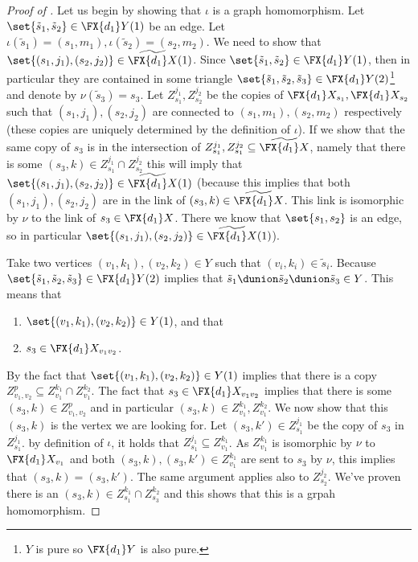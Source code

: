 \begin{proof}[Proof of ]
    Let us begin by showing that \(\iota\) is a graph homomorphism. Let \(\set{\tilde{s}_1,\tilde{s}_2} \in \FX{d_1}Y(1)\) be an edge. Let \(\iota(\tilde{s}_1) = (s_1,m_1), \iota(\tilde{s}_2)=(s_2,m_2)\). We need to show that \(\set{(s_1,j_1), (s_2,j_2)} \in \widetilde{\FX{d_1}X}(1)\). Since \(\set{\tilde{s}_1,\tilde{s}_2} \in \FX{d_1}Y(1)\), then in particular they are contained in some triangle \(\set{\tilde{s}_1,\tilde{s}_2,\tilde{s}_3} \in \FX{d_1}Y(2)\)\footnote{\(Y\) is pure so \(\FX{d_1}Y\) is also pure.} and denote by \(\nu(\tilde{s}_3)=s_3\). Let \(Z_{s_1}^{j_1}, Z_{s_2}^{j_2}\) be the copies of \(\FX{d_1}X_{s_1},\FX{d_1}X_{s_2}\) such that \((s_1,j_1), (s_2,j_2)\) are connected to \((s_1,m_1),(s_2,m_2)\) respectively (these copies are uniquely determined by the definition of \(\iota\)). If we show that the same copy of \(s_3\) is in the intersection of \(Z_{s_1}^{j_1},Z_{s_1}^{j_2} \subseteq \widetilde{\FX{d_1}X}\), namely that there is some \((s_3,k) \in Z_{s_1}^{j_1} \cap Z_{s_2}^{j_2}\) this will imply that \(\set{(s_1,j_1), (s_2,j_2)} \in \widetilde{\FX{d_1}X}(1)\) (because this implies that both \((s_1,j_1),(s_2,j_2)\) are in the link of \((s_3,k) \in \widetilde{\FX{d_1}X}\). This link is isomorphic by \(\nu\) to the link of \(s_3 \in \FX{d_1}X\). There we know that \(\set{s_1,s_2}\) is an edge, so in particular \(\set{(s_1,j_1), (s_2,j_2)} \in \widetilde{\FX{d_1}X}(1)\)).
    
    Take two vertices \((v_1,k_1),(v_2,k_2) \in Y\) such that \((v_i,k_i) \in \tilde{s}_i\). Because \(\set{\tilde{s}_1,\tilde{s}_2, \tilde{s}_3}  \in \FX{d_1}Y(2)\) implies that \(\tilde{s}_1 \dunion \tilde{s}_2 \dunion \tilde{s}_3 \in Y\). This means that 
    \begin{enumerate}
        \item \(\set{(v_1,k_1),(v_2,k_2)} \in Y(1)\), and that
        \item \(s_3 \in \FX{d_1}X_{v_1 v_2}\).
    \end{enumerate} 
    By  the fact that \(\set{(v_1,k_1),(v_2,k_2)} \in Y(1)\) implies that there is a copy \(Z_{v_1,v_2}^{p} \subseteq Z_{v_1}^{k_1} \cap Z_{v_1}^{k_2}\). The fact that \(s_3 \in \FX{d_1}X_{v_1 v_2}\) implies that there is some \((s_3,k) \in Z_{v_1,v_2}^{p}\) and in particular \((s_3,k) \in Z_{v_1}^{k_1},Z_{v_1}^{k_2}\). We now show that this \((s_3,k)\) is the vertex we are looking for. Let \((s_3,k') \in Z_{s_1}^{j_1}\) be the copy of \(s_3\) in \( Z_{s_1}^{j_1}\). by definition of \(\iota\), it holds that \(Z_{s_1}^{j_1} \subseteq Z_{v_1}^{k_1}\). As \(Z_{v_1}^{k_1}\) is isomorphic by \(\nu\) to \(\FX{d_1}X_{v_1}\) and both \((s_3,k),(s_3,k') \in Z_{v_1}^{k_1}\) are sent to \(s_3\) by \(\nu\), this implies that \((s_3,k)=(s_3,k')\). The same argument applies also to \(Z_{s_2}^{j_2}\). We've proven there is an \((s_3,k) \in Z_{s_1}^{k_1} \cap Z_{s_3}^{k_2}\) and this shows that this is a grpah homomorphism.
    

\end{proof}
